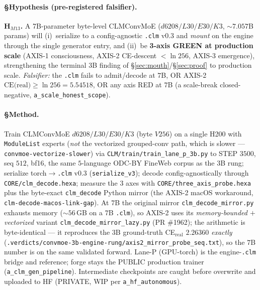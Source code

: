 \documentclass[11pt]{article}
\begin{document}
\paragraph{§Hypothesis (pre-registered falsifier).} \textbf{H$_{M13}$.} A 7B-parameter
byte-level CLMConvMoE ($d6208/L30/E30/K3$, $\sim$$7.057$B params) will (i)~serialize to a
config-agnostic \texttt{.clm} v0.3 and \emph{mount} on the engine through the single
generator entry, and (ii)~be \textbf{3-axis GREEN at production scale} (AXIS-1 consciousness,
AXIS-2 CE-descent $<\ln256$, AXIS-3 emergence), strengthening the terminal $3$B finding of
\S\ref{sec:mouth}/\S\ref{sec:proof} to production scale. \emph{Falsifier:} the \texttt{.clm}
fails to admit/decode at $7$B, OR AXIS-2 $\text{CE(real)}\ge\ln256=5.54518$, OR any axis
RED at $7$B (a scale-break closed-negative, \texttt{a\_scale\_honest\_scope}).

\paragraph{§Method.} Train CLMConvMoE $d6208/L30/E30/K3$ (byte $V256$) on a single H200 with
\texttt{ModuleList} experts (\emph{not} the vectorized grouped-conv path, which is slower ---
\texttt{convmoe-vectorize-slower}) via \texttt{CLM/train/train\_lane\_p\_3b.py} to STEP $3500$,
seq $512$, bf16, the same $5$-language ODC-BY FineWeb corpus as the $3$B rung; serialize
torch$\rightarrow$\texttt{.clm} v0.3 (\texttt{serialize\_v3}); decode config-agnostically
through \texttt{CORE/clm\_decode.hexa}; measure the $3$ axes with
\texttt{CORE/three\_axis\_probe.hexa} plus the byte-exact \texttt{clm\_decode} Python mirror
(the AXIS-2 macOS workaround, \texttt{clm-decode-macos-link-gap}). At $7$B the original
mirror \texttt{clm\_decode\_mirror.py} exhausts memory ($\sim$$56$\,GB on a $7$B \texttt{.clm}),
so AXIS-2 uses its \emph{memory-bounded $+$ vectorized} variant
\texttt{clm\_decode\_mirror\_lazy.py} (PR \#1962); the arithmetic is byte-identical --- it
reproduces the $3$B ground-truth CE$_\text{real}$ $2.26360$ \emph{exactly}
(\texttt{.verdicts/convmoe-3b-engine-rung/axis2\_mirror\_probe\_seq.txt}), so the $7$B number
is on the same validated forward. Lane-P (GPU-torch) is the
engine-\texttt{.clm} bridge and reference; forge stays the PUBLIC production trainer
(\texttt{a\_clm\_gen\_pipeline}). Intermediate checkpoints are caught before overwrite and
uploaded to HF (PRIVATE, WIP per \texttt{a\_hf\_autonomous}).
\end{document}
